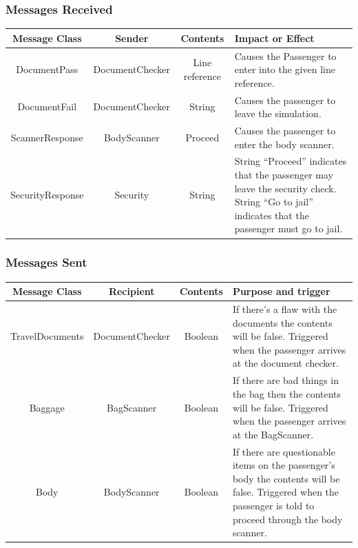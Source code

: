 \documentclass[12pt,letterpaper]{scrartcl}
\begin{document}
\subsubsection*{Messages Received}
\begin{center}
    \begin{tabulary}{\textwidth}{|c|c|c|L|}
        \hline
        Message Class & Sender & Contents & Impact or Effect \\ \hline
        DocumentPass & DocumentChecker & Line reference & Causes the Passenger to enter into the given line reference. \\
        \hline
        DocumentFail & DocumentChecker & String & Causes the passenger to leave the simulation. \\
        \hline
        ScannerResponse & BodyScanner & Proceed & Causes the passenger to enter the body scanner. \\
        \hline
        SecurityResponse & Security & String & String ``Proceed'' indicates that the passenger may leave the security check. String ``Go to jail'' indicates that the passenger must go to jail. \\
        \hline
    \end{tabulary}
\end{center}

\subsubsection*{Messages Sent}
\begin{center}
\begin{tabulary}{\textwidth}{|c|c|c|L|}
	\hline
	Message Class & Recipient & Contents & Purpose and trigger \\
	\hline
	TravelDocuments & DocumentChecker & Boolean & If there's a flaw with the documents the contents will be 
false. Triggered when the passenger arrives at the document checker. \\ \hline
	Baggage & BagScanner & Boolean & If there are bad things in the bag then the contents will be false. 
Triggered when the passenger arrives at the BagScanner. \\ \hline
	Body & BodyScanner & Boolean & If there are questionable items on the passenger's body the contents will be 
false. Triggered when the passenger is told to proceed through the body scanner. \\
	\hline
\end{tabulary}
\end{center}
\end{document}
